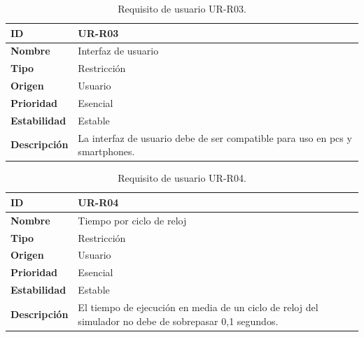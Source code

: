 \begin{center}
\begin{table}[htbp]
\centering
\caption{Requisito de usuario UR-R03.}
\begin{tabular}{@{}p{2.5cm} p{9cm}@{}} 
\toprule
\textbf{ID} 				& UR-R03 \\
\midrule
\textbf{Nombre} 			& Interfaz de usuario \\
\midrule
\textbf{Tipo} 			& Restricción \\
\midrule
\textbf{Origen} 			& Usuario \\
\midrule
\textbf{Prioridad}		& Esencial \\
\midrule
\textbf{Estabilidad} 		& Estable \\
\midrule
\textbf{Descripción} 	& La interfaz de usuario debe de ser compatible para uso en \acrshort{pc}s y smartphones. \\
\bottomrule
\end{tabular}
\label{tab:urr03}
\end{table}
\end{center}

\begin{center}
\begin{table}[htbp]
\centering
\caption{Requisito de usuario UR-R04.}
\begin{tabular}{@{}p{2.5cm} p{9cm}@{}} 
\toprule
\textbf{ID} 				& UR-R04 \\
\midrule
\textbf{Nombre} 			& Tiempo por ciclo de reloj \\
\midrule
\textbf{Tipo} 			& Restricción \\
\midrule
\textbf{Origen} 			& Usuario \\
\midrule
\textbf{Prioridad}		& Esencial \\
\midrule
\textbf{Estabilidad} 		& Estable \\
\midrule
\textbf{Descripción} 	& El tiempo de ejecución en media de un ciclo de reloj del simulador no debe de sobrepasar 0,1 segundos. \\
\bottomrule
\end{tabular}
\label{tab:urr04}
\end{table}
\end{center}

